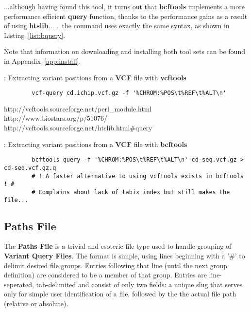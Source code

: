 ...although having found this tool, it turns out that \textbf{bcftools}
implements a more performance efficient \textbf{query} function, thanks to
the performance gains as a result of using \textbf{htslib}...
...the command uses exactly the same syntax, as shown in Listing~\ref{list:bquery}.

Note that information on downloading and installing both tool sets can be found
in Appendix~\ref{app:install}.

\begin{listing}[H]
    \caption[vquery]{: Extracting variant positions from a \textbf{VCF} file
    with \textbf{vcftools}}
    \label{list:vquery}
    \begin{verbatim}
        vcf-query cd.ichip.vcf.gz -f '%CHROM:%POS\t%REF\t%ALT\n'
    \end{verbatim}
\end{listing}
http://vcftools.sourceforge.net/perl\_module.html
http://www.biostars.org/p/51076/
http://vcftools.sourceforge.net/htslib.html\#query

\begin{listing}[H]
    \caption[bquery]{: Extracting variant positions from a \textbf{VCF} file
    with \textbf{bcftools}}
    \label{list:bquery}
    \begin{verbatim}
        bcftools query -f '%CHROM:%POS\t%REF\t%ALT\n' cd-seq.vcf.gz > cd-seq.vcf.gz.q
        # ! A faster alternative to using vcftools exists in bcftools ! #
        # Complains about lack of tabix index but still makes the file...
    \end{verbatim}
\end{listing}



\subsection{Paths File}
\label{sec:pathsfile}

The \textbf{Paths File} is a trivial and esoteric file type used to handle
grouping of \textbf{Variant Query Files}. The format is simple, using lines
beginning with a '\#' to delimit desired file groups. Entries following that
line (until the next group definition) are considered to be a member of that
group. Entries are line-seperated, tab-delimited and consist of only two fields:
a unique slug that serves only for simple user identification of a file,
followed by the the actual file path (relative or absolute).

